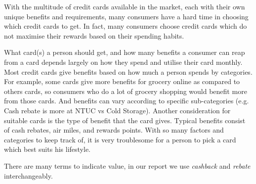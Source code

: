 With the multitude of credit cards available in the market, each with their own unique benefits and requirements, many consumers have a hard time in choosing which credit cards to get. In fact, many consumers choose credit cards which do not maximise their rewards based on their spending habits.

What card(s) a person should get, and how many benefits a consumer can reap from a card depends largely on how they spend and utilise their card monthly. Most credit cards give benefits based on how much a person spends by categories. For example, some cards give more benefits for grocery online  as compared to others cards, so consumers who do a lot of grocery shopping would benefit more from those cards. And benefits can vary according to specific sub-categories  (e.g. Cash rebate is more at NTUC vs Cold Storage). Another consideration for suitable cards is the type of benefit that the card gives. Typical benefits consist of cash rebates, air miles, and rewards points. With so many factors and categories to keep track of, it is very troublesome for a person to pick a card which best suits his lifestyle.

There are many terms to indicate value, in our report we use \textit{cashback} and \textit{rebate} interchangeably.